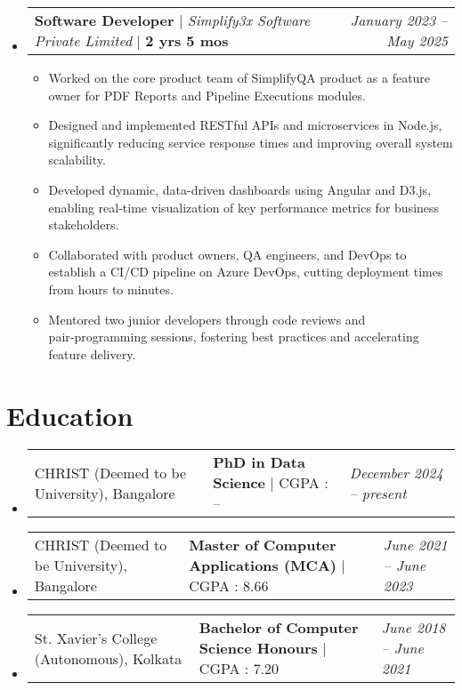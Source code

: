 \documentclass[letterpaper,10pt]{article}
\makeatletter
\newcommand{\subheadingtitlevspace}{\vspace{-3pt}}
\newcommand{\resumeItem}[1]{\item{#1 \vspace{-4pt}}}
\newcommand{\titleItem}[1]{\textbf{#1}}
\newcommand{\resumeSubheading}[4]{
  \item
    \begin{tabular*}{0.97\textwidth}[t]{l@{\extracolsep{\fill}}l@{}l}     
      {#1} & \titleItem{#3} | {#2} & \textit{#4}\\
    \end{tabular*}\vspace{-10pt}
}
\newcommand{\resumeProjectHeading}[2]{
    \item
    \begin{tabular*}{0.97\textwidth}{l@{\extracolsep{\fill}}r}
        #1 & \textit{ #2} \\
    \end{tabular*}\vspace{-9pt}
}
\newcommand{\resumeSubHeadingListStart}{\subheadingtitlevspace\begin{itemize}[leftmargin=0.15in, label={}]}
\newcommand{\resumeSubHeadingListEnd}{\end{itemize}}
\newcommand{\resumeItemListStart}{\begin{itemize}}
\newcommand{\resumeItemListEnd}{\end{itemize}\vspace{-8pt}}
\makeatother
\begin{document}
\resumeSubHeadingListStart
\resumeProjectHeading{\titleItem{Software Developer} $|$ \emph{Simplify3x Software Private Limited} $|$ \textbf{2 yrs 5 mos}}{January 2023 -- May 2025} 
    \resumeItemListStart
        \resumeItem{Worked on the core product team of SimplifyQA product as a feature owner for PDF Reports and Pipeline Executions modules.}
        \resumeItem{Designed and implemented RESTful APIs and microservices in Node.js, significantly reducing service response times and improving overall system scalability.}
        \resumeItem{Developed dynamic, data-driven dashboards using Angular and D3.js, enabling real‑time visualization of key performance metrics for business stakeholders.}
        \resumeItem{Collaborated with product owners, QA engineers, and DevOps to establish a CI/CD pipeline on Azure DevOps, cutting deployment times from hours to minutes.}
        \resumeItem{Mentored two junior developers through code reviews and pair‑programming sessions, fostering best practices and accelerating feature delivery.}
    \resumeItemListEnd
\resumeSubHeadingListEnd


\section{Education}
\resumeSubHeadingListStart
    \resumeSubheading{CHRIST (Deemed to be University), Bangalore}{CGPA : --}{PhD in Data Science}{December 2024 -- present}
    \resumeSubheading{CHRIST (Deemed to be University), Bangalore}{CGPA : 8.66}{Master of Computer Applications (MCA)}{June 2021 -- June 2023}
    \resumeSubheading{St. Xavier's College (Autonomous), Kolkata}{CGPA : 7.20}{Bachelor of Computer Science Honours}{June 2018 -- June 2021}
\resumeSubHeadingListEnd
\vspace{-8pt}

\end{document}
